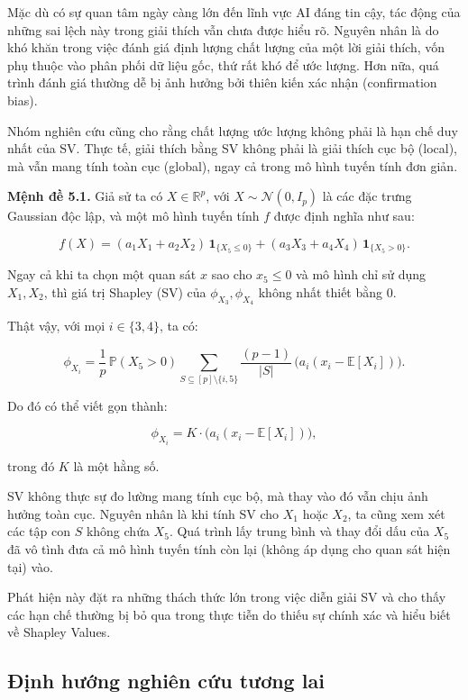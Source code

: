 \documentclass[12pt, a4paper]{article}
\theoremstyle{plain}
\theoremstyle{proposition}
\theoremstyle{lemma}
\begin{document}
Mặc dù có sự quan tâm ngày càng lớn đến lĩnh vực AI đáng tin cậy, tác động của những sai lệch này trong giải thích vẫn chưa được hiểu rõ. Nguyên nhân là do khó khăn trong việc đánh giá định lượng chất lượng của một lời giải thích, vốn phụ thuộc vào phân phối dữ liệu gốc, thứ rất khó để ước lượng. Hơn nữa, quá trình đánh giá thường dễ bị ảnh hưởng bởi thiên kiến xác nhận (confirmation bias).

Nhóm nghiên cứu cũng cho rằng chất lượng ước lượng không phải là hạn chế duy nhất của SV. Thực tế, giải thích bằng SV không phải là giải thích cục bộ (local), mà vẫn mang tính toàn cục (global), ngay cả trong mô hình tuyến tính đơn giản.

\textbf{Mệnh đề 5.1.} 
Giả sử ta có $X \in \mathbb{R}^p$, với $X \sim \mathcal{N}(0, I_p)$ là các đặc trưng Gaussian độc lập, 
và một mô hình tuyến tính $f$ được định nghĩa như sau:

\[
f(X) = (a_1X_1 + a_2X_2)\,\mathbf{1}_{\{X_5 \le 0\}} + (a_3X_3 + a_4X_4)\,\mathbf{1}_{\{X_5 > 0\}}.
\]

Ngay cả khi ta chọn một quan sát $x$ sao cho $x_5 \le 0$ và mô hình chỉ sử dụng $X_1, X_2$, 
thì giá trị Shapley (SV) của $\phi_{X_3}, \phi_{X_4}$ không nhất thiết bằng $0$. 

Thật vậy, với mọi $i \in \{3, 4\}$, ta có:

\[
\phi_{X_i} = \frac{1}{p}\,\mathbb{P}(X_5 > 0) 
\sum_{S \subseteq [p]\setminus \{i,5\}} 
\frac{(p-1)}{|S|}\,\Big( a_i(x_i - \mathbb{E}[X_i]) \Big).
\]

Do đó có thể viết gọn thành:

\[
\phi_{X_i} = K \cdot \Big(a_i(x_i - \mathbb{E}[X_i])\Big),
\]

trong đó $K$ là một hằng số.

SV không thực sự đo lường mang tính cục bộ, mà thay vào đó vẫn chịu ảnh hưởng toàn cục. Nguyên nhân là khi tính SV cho $X_1$ hoặc $X_2$, ta cũng xem xét các tập con $S$ không chứa $X_5$. Quá trình lấy trung bình và thay đổi dấu của $X_5$ đã vô tình đưa cả mô hình tuyến tính còn lại (không áp dụng cho quan sát hiện tại) vào. 

Phát hiện này đặt ra những thách thức lớn trong việc diễn giải SV và cho thấy các hạn chế thường bị bỏ qua trong thực tiễn do thiếu sự chính xác và hiểu biết về Shapley Values.

\subsection{Định hướng nghiên cứu tương lai}
\end{document}
